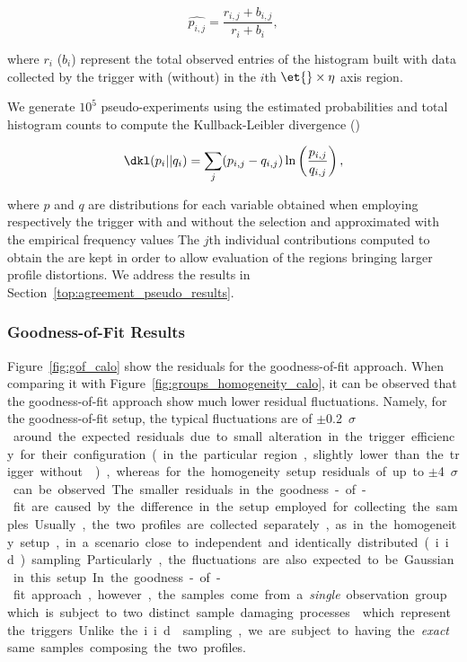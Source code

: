\begin{equation}
  \hat{p_{i,j}}=\frac{r_{i,j}+b_{i,j}}{r_i+b_i},
\end{equation}

\noindent where $r_i$ ($b_i$) represent the total observed entries of the
histogram built with data collected by the trigger with (without) \rnn{} in the
$i$th $\et{}\times\eta{}$ axis region.


We generate $10^5$ pseudo-experiments using the estimated
probabilities and total histogram counts to compute the Kullback-Leibler
divergence (\dkl{})~\cite{2009_cichocki_nonnegative}

\begin{equation}
\dkl(p_i||q_i) = \sum\limits_{j} (p_{i,j}-q_{i,j})\ln\left(\frac{p_{i,j}}{q_{i,j}}\right),
\end{equation}

\noindent where $p$ and $q$ are distributions for each variable obtained when
employing respectively the trigger with and without the \rnn{} selection and
approximated with the empirical frequency values  The $j$th individual
contributions computed to obtain the \dkl{} are kept in order to allow
evaluation of the regions bringing larger profile distortions.  We address the
results in Section~\ref{top:agreement_pseudo_results}.

\subsubsection{Goodness-of-Fit Results}\label{top:agreement_gof_results}

Figure~\ref{fig:gof_calo} show the residuals for the goodness-of-fit approach.
When comparing it with Figure~\ref{fig:groups_homogeneity_calo},
it can be observed that the goodness-of-fit approach show much lower
residual fluctuations. Namely, for the goodness-of-fit setup, the typical
fluctuations are of $\pm$\SI{0.2}{$\sigma$} around the expected residuals due to
small alteration in the trigger efficiency for their configuration (in the
particular region, slightly lower than the trigger without \rnn{}), whereas for
the homogeneity setup residuals of up to $\pm$\SI{4}{$\sigma$} can be observed.
The smaller residuals in the goodness-of-fit are caused by the difference in the
setup employed for collecting the samples. Usually, the two profiles are
collected separately, as in the homogeneity setup, in a scenario close to
independent and identically distributed (i.i.d.) sampling. Particularly, the
fluctuations are also expected to be Gaussian in this setup. In the
goodness-of-fit approach, however, the samples come from a \emph{single}
observation group which is subject to two distinct sample damaging
processes~\cite{rao1965discrete} which represent the triggers. Unlike the
i.i.d.\@ sampling, we are subject to having the \emph{exact} same samples
composing the two profiles.

